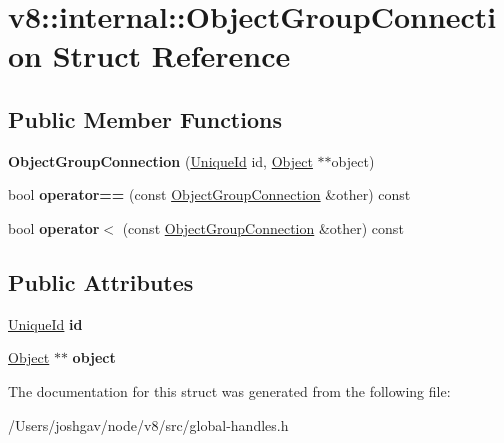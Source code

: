 \hypertarget{structv8_1_1internal_1_1_object_group_connection}{}\section{v8\+:\+:internal\+:\+:Object\+Group\+Connection Struct Reference}
\label{structv8_1_1internal_1_1_object_group_connection}
\subsection*{Public Member Functions}
\begin{DoxyCompactItemize}
\item 
{\bfseries Object\+Group\+Connection} (\hyperlink{classv8_1_1_unique_id}{Unique\+Id} id, \hyperlink{classv8_1_1internal_1_1_object}{Object} $\ast$$\ast$object)\hypertarget{structv8_1_1internal_1_1_object_group_connection_aae942fc86972d3e4b3789de8c32615da}{}\label{structv8_1_1internal_1_1_object_group_connection_aae942fc86972d3e4b3789de8c32615da}

\item 
bool {\bfseries operator==} (const \hyperlink{structv8_1_1internal_1_1_object_group_connection}{Object\+Group\+Connection} \&other) const \hypertarget{structv8_1_1internal_1_1_object_group_connection_ab39b4572ee5f01d26517501fb91e5e87}{}\label{structv8_1_1internal_1_1_object_group_connection_ab39b4572ee5f01d26517501fb91e5e87}

\item 
bool {\bfseries operator$<$} (const \hyperlink{structv8_1_1internal_1_1_object_group_connection}{Object\+Group\+Connection} \&other) const \hypertarget{structv8_1_1internal_1_1_object_group_connection_ad0adfd0b34ab39d150b1b0e9ee078077}{}\label{structv8_1_1internal_1_1_object_group_connection_ad0adfd0b34ab39d150b1b0e9ee078077}

\end{DoxyCompactItemize}
\subsection*{Public Attributes}
\begin{DoxyCompactItemize}
\item 
\hyperlink{classv8_1_1_unique_id}{Unique\+Id} {\bfseries id}\hypertarget{structv8_1_1internal_1_1_object_group_connection_ac9945a8f8541e7f539ee06ef82c8ebfe}{}\label{structv8_1_1internal_1_1_object_group_connection_ac9945a8f8541e7f539ee06ef82c8ebfe}

\item 
\hyperlink{classv8_1_1internal_1_1_object}{Object} $\ast$$\ast$ {\bfseries object}\hypertarget{structv8_1_1internal_1_1_object_group_connection_a28554c5bd2d7fe28cd62323dd87e52f3}{}\label{structv8_1_1internal_1_1_object_group_connection_a28554c5bd2d7fe28cd62323dd87e52f3}

\end{DoxyCompactItemize}


The documentation for this struct was generated from the following file\+:\begin{DoxyCompactItemize}
\item 
/\+Users/joshgav/node/v8/src/global-\/handles.\+h\end{DoxyCompactItemize}

